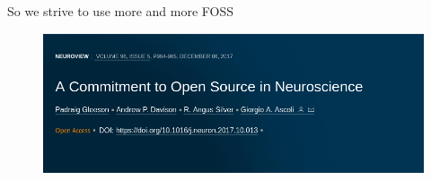 \begin{frame}[c]{So we strive to use more and more FOSS}
  \begin{figure}[htpb]
    \centering
    \includegraphics[width=\linewidth]{images/open-source-paper.png}
  \end{figure}
\end{frame}
